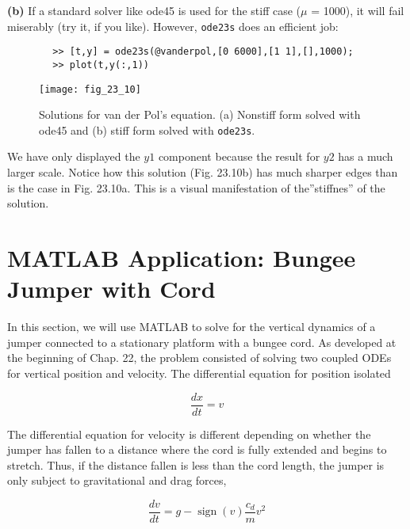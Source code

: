 \documentclass[../main.tex]{subfiles}
\begin{document}
\begin{exmp}
    \noindent \textbf{(b)} If a standard solver like ode45 is used for the stiff case ($\mu$ = 1000), it will fail miserably (try it, if you like). However, \texttt{ode23s} does an efficient job:
    \begin{lstlisting}
        >> [t,y] = ode23s(@vanderpol,[0 6000],[1 1],[],1000);
        >> plot(t,y(:,1))
    \end{lstlisting}


    \begin{figure}[H]
        \centering
        \texttt{[image: fig\_23\_10]}
       \caption{\textsf{Solutions for van der Pol's equation. (a) Nonstiff form solved with ode45 and (b) stiff form solved with \texttt{ode23s}.}}\label{fig:fig_23_10}
    \end{figure}

    We have only displayed the $y1$ component because the result for $y2$ has a much larger scale.
    Notice how this solution (Fig. 23.10b) has much sharper edges than is the case in Fig. 23.10a.
    This is a visual manifestation of the''stiffnes'' of the solution.
\end{exmp}
\vspace{10mm}


\section{MATLAB Application: Bungee Jumper with Cord}
\noindent In this section, we will use MATLAB to solve for the vertical dynamics of a jumper connected to a stationary platform with a bungee cord. As developed at the beginning of Chap. 22, the problem consisted of solving two coupled ODEs for vertical position and
velocity. The differential equation for position isolated

\begin{equation}
    \tag{23.26}
    \frac{dx}{dt} = v
\end{equation}

\noindent The differential equation for velocity is different depending on whether the jumper has fallen to a distance where the cord is fully extended and begins to stretch. Thus, if the distance
fallen is less than the cord length, the jumper is only subject to gravitational and drag forces,

\begin{equation}
    \tag{23.27a}
    \frac{d v}{d t}=g-\operatorname{sign}(v) \frac{c_{d}}{m} v^{2}
\end{equation}
\end{document}
